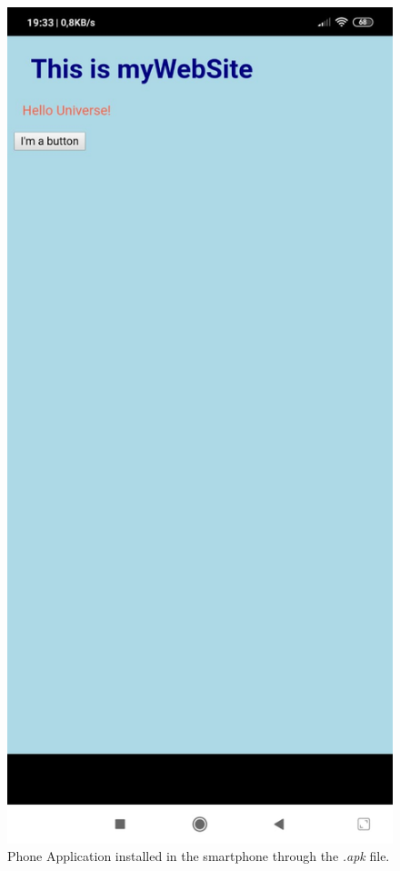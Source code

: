 \begin{figure}
    \centering
    \includegraphics[width= 0.6 \textwidth]{Figures/CordovaApp}
    \caption{Phone Application installed in the smartphone through the \textit{.apk} file.}
    \label{fig:CordovaApp}
\end{figure}



















 